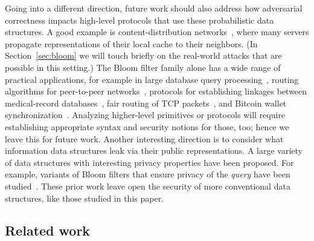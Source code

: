 Going into a different direction, future work should
also address how adversarial correctness impacts high-level protocols that use
these probabilistic data structures. A good example is content-distribution
networks~\cite{byers2002informed}, where many servers propagate representations
of their local cache to their neighbors. (In Section~\ref{sec:bloom} we will
touch briefly on the real-world attacks that are possible in this setting.) The
Bloom filter family alone has a wide range of practical applications, for
example in large database query processing~\cite{broder2004network}, routing
algorithms for peer-to-peer networks~\cite{reynolds2003efficient}, protocols for
establishing linkages between medical-record databases~\cite{schnell2011novel},
fair routing of TCP packets~\cite{feng2001stochastic}, and Bitcoin wallet
synchronization~\cite{gervais2014privacy}.
%
Analyzing higher-level primitives or protocols will require establishing
appropriate syntax and security notions for those, too; hence we leave this for
future work.
%
Another interesting direction is to consider what information data structures
leak via their public representations. A large variety of data structures with
interesting privacy properties have been proposed. For example, variants of
Bloom filters that ensure privacy of the \emph{query} have been
studied~\cite{bellovin2004privacy,nojima2009cryptographically}. These prior work
leave open the security of more conventional data structures, like those studied
in this paper.


\subsection{Related work}



